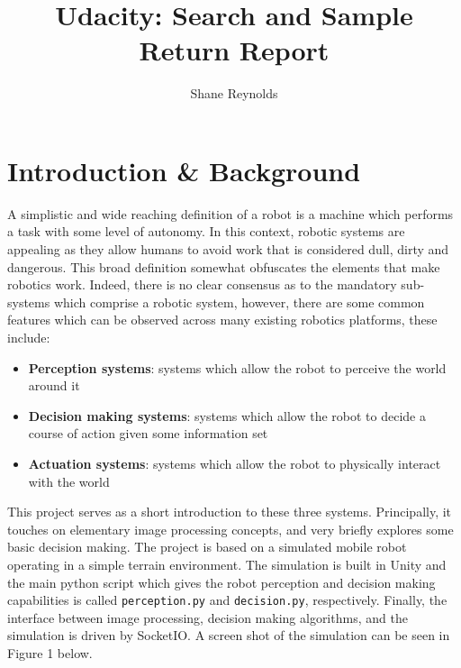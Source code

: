 \documentclass[a4paper]{article}
\begin{document}
\title{Udacity: Search and Sample Return Report}
\author{Shane Reynolds}
\maketitle

\tableofcontents

\newpage

\section{Introduction \& Background}
A simplistic and wide reaching definition of a robot is a machine which performs a task with some level of autonomy. In this context, robotic systems are appealing as they allow humans to avoid work that is considered dull, dirty and dangerous. This broad definition somewhat obfuscates the elements that make robotics work. Indeed, there is no clear consensus as to the mandatory sub-systems which comprise a robotic system, however, there are some common features which can be observed across many existing robotics platforms, these include:
\begin{itemize}
\item \textbf{Perception systems}: systems which allow the robot to perceive the world around it
\item \textbf{Decision making systems}: systems which allow the robot to decide a course of action given some information set
\item \textbf{Actuation systems}: systems which allow the robot to physically interact with the world
\end{itemize}

This project serves as a short introduction to these three systems. Principally, it touches on elementary image processing concepts, and very briefly explores some basic decision making. The project is based on a simulated mobile robot operating in a simple terrain environment. The simulation is built in Unity and the main python script which gives the robot perception and decision making capabilities is called \verb|perception.py| and \verb|decision.py|, respectively. Finally, the interface between image processing, decision making algorithms, and the simulation is driven by SocketIO. A screen shot of the simulation can be seen in Figure 1 below.

\vspace{1cm}
\end{document}
